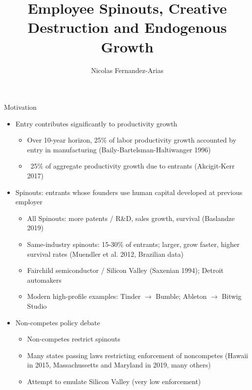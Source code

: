 \documentclass[english,usenames,dvipsnames]{beamer}
\title{Employee Spinouts, Creative Destruction and Endogenous Growth}
\author{Nicolas Fernandez-Arias}
\begin{document}
\maketitle

\begin{frame}{Motivation}
\begin{itemize}
	\item Entry contributes significantly to productivity growth
	\begin{itemize}
		\item Over 10-year horizon, 25\% of labor productivity growth accounted by entry in manufacturing (Baily-Bartelsman-Haltiwanger 1996)
		\item ~25\% of aggregate productivity growth due to entrants (Akcigit-Kerr 2017)
	\end{itemize}
	\item Spinouts: entrants whose founders use human capital developed at previous employer
	\begin{itemize}
		\item All Spinouts: more patents / R\&D, sales growth, survival (Baslandze 2019) 
		\item Same-industry spinouts: 15-30\% of entrants; larger, grow faster, higher survival rates (Muendler et al. 2012, Brazilian data)
		\item Fairchild semiconductor / Silicon Valley (Saxenian 1994); Detroit automakers
		\item Modern high-profile examples: Tinder $\rightarrow$ Bumble; Ableton $\rightarrow$ Bitwig Studio
	\end{itemize}
\end{itemize}
\end{frame}

\begin{frame}
\begin{itemize}
	\item Non-competes policy debate
	\begin{itemize}
		\item Non-competes restrict spinouts
		\item Many states passing laws restricting enforcement of noncompetes (Hawaii in 2015, Massachussetts and Maryland in 2019, many others)
		\item Attempt to emulate Silicon Valley (very low enforcement)
	\end{itemize}
\end{itemize}
\end{frame}
\end{document}
